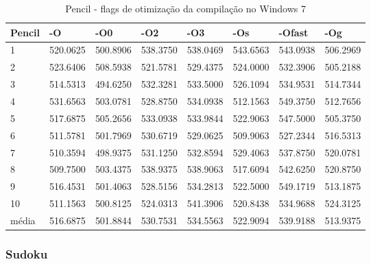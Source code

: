 \begin{table}[!ht]
\centering
\tiny
\caption{Pencil - flags de otimização da compilação no Windows 7}
\label{tab:otimizacao_compilacao:windows:pencil}
\begin{tabular}{llllllll}
\textbf{Pencil}    & \textbf{-O}  & \textbf{-O0}   & \textbf{-O2} & \textbf{-O3} & \textbf{-Os} & \textbf{-Ofast} & \textbf{-Og} \\ \toprule
1                  & 520.0625     &   500.8906     &    538.3750  &    538.0469  &    543.6563  &   543.0938      &   506.2969       \\ 
2                  & 523.6406     &   508.5938     &    521.5781  &    529.4375  &    524.0000  &   532.3906      &   505.2188       \\ 
3                  & 514.5313     &   494.6250     &    532.3281  &    533.5000  &    526.1094  &   534.9531      &   514.7344       \\ 
4                  & 531.6563     &   503.0781     &    528.8750  &    534.0938  &    512.1563  &   549.3750      &   512.7656       \\ 
5                  & 517.6875     &   505.2656     &    533.0938  &    533.9844  &    522.9063  &   547.5000      &   505.3750       \\ 
6                  & 511.5781     &   501.7969     &    530.6719  &    529.0625  &    509.9063  &   527.2344      &   516.5313       \\ 
7                  & 510.3594     &   498.9375     &    531.1250  &    532.8594  &    529.4063  &   537.8750      &   520.0781       \\ 
8                  & 509.7500     &   503.4375     &    538.9375  &    538.9063  &    517.6094  &   542.6250      &   520.8750       \\ 
9                  & 516.4531     &   501.4063     &    528.5156  &    534.2813  &    522.5000  &   549.1719      &   513.1875       \\ 
10                 & 511.1563     &   500.8125     &    524.0313  &    541.3906  &    520.8438  &   534.9688      &   524.3125       \\ \bottomrule
média              & 516.6875     &   501.8844     &    530.7531  &    534.5563  &    522.9094  &   539.9188      &   513.9375       \\ 
\end{tabular}
\end{table}


\clearpage
\subsubsection*{Sudoku}

